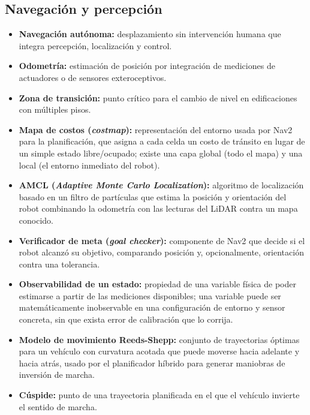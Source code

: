 \documentclass[12pt,letterpaper]{article}
\begin{document}
\subsection{Navegación y percepción}
\begin{itemize}[leftmargin=*]
    \item \textbf{Navegación autónoma:} desplazamiento sin intervención humana que integra percepción, localización y control.
    \item \textbf{Odometría:} estimación de posición por integración de mediciones de actuadores o de sensores exteroceptivos.
    \item \textbf{Zona de transición:} punto crítico para el cambio de nivel en edificaciones con múltiples pisos.
    \item \textbf{Mapa de costos (\textit{costmap}):} representación del entorno usada por Nav2 para la planificación, que asigna a cada celda un costo de tránsito en lugar de un simple estado libre/ocupado; existe una capa global (todo el mapa) y una local (el entorno inmediato del robot).
    \item \textbf{AMCL (\textit{Adaptive Monte Carlo Localization}):} algoritmo de localización basado en un filtro de partículas que estima la posición y orientación del robot combinando la odometría con las lecturas del LiDAR contra un mapa conocido.
    \item \textbf{Verificador de meta (\textit{goal checker}):} componente de Nav2 que decide si el robot alcanzó su objetivo, comparando posición y, opcionalmente, orientación contra una tolerancia.
    \item \textbf{Observabilidad de un estado:} propiedad de una variable física de poder estimarse a partir de las mediciones disponibles; una variable puede ser matemáticamente inobservable en una configuración de entorno y sensor concreta, sin que exista error de calibración que lo corrija.
    \item \textbf{Modelo de movimiento Reeds-Shepp:} conjunto de trayectorias óptimas para un vehículo con curvatura acotada que puede moverse hacia adelante y hacia atrás, usado por el planificador híbrido para generar maniobras de inversión de marcha.
    \item \textbf{Cúspide:} punto de una trayectoria planificada en el que el vehículo invierte el sentido de marcha.
\end{itemize}
\end{document}
